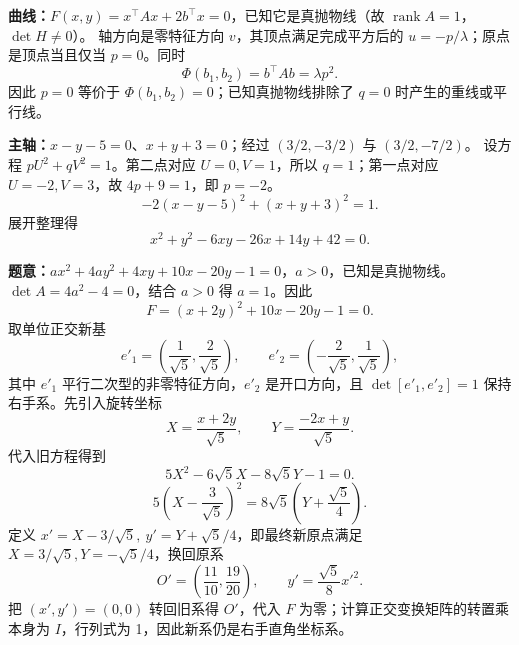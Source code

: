 \textbf{曲线：}$F(x,y)=x^\top Ax+2b^\top x=0$，已知它是真抛物线（故 $\operatorname{rank}A=1$，$\det H\ne0$）。
轴方向是零特征方向 $v$，其顶点满足完成平方后的 $u=-p/\lambda$；原点是顶点当且仅当 $p=0$。同时
\[
\Phi(b_1,b_2)=b^\top A b=\lambda p^2.
\]
因此 $p=0$ 等价于 $\Phi(b_1,b_2)=0$；已知真抛物线排除了 $q=0$ 时产生的重线或平行线。

\textbf{主轴：}$x-y-5=0$、$x+y+3=0$；经过 $(3/2,-3/2)$ 与 $(3/2,-7/2)$。
设方程 $pU^2+qV^2=1$。第二点对应 $U=0,V=1$，所以 $q=1$；第一点对应 $U=-2,V=3$，故 $4p+9=1$，即 $p=-2$。
\[
-2(x-y-5)^2+(x+y+3)^2=1.
\]
展开整理得
\[\boxed{x^2+y^2-6xy-26x+14y+42=0.}\]

\textbf{题意：}$ax^2+4ay^2+4xy+10x-20y-1=0$，$a>0$，已知是真抛物线。
 $\det A=4a^2-4=0$，结合 $a>0$ 得 $\boxed{a=1}$。因此
\[F=(x+2y)^2+10x-20y-1=0.
\]
 取单位正交新基
\[
e'_1=\left(\frac1{\sqrt5},\frac2{\sqrt5}\right),\qquad
e'_2=\left(-\frac2{\sqrt5},\frac1{\sqrt5}\right),
\]
其中 $e'_1$ 平行二次型的非零特征方向，$e'_2$ 是开口方向，且 $\det[e'_1,e'_2]=1$ 保持右手系。先引入旋转坐标
\[
X=\frac{x+2y}{\sqrt5},\qquad Y=\frac{-2x+y}{\sqrt5}.
\]
代入旧方程得到
\[
5X^2-6\sqrt5X-8\sqrt5Y-1=0.
\]
\[
5\left(X-\frac3{\sqrt5}\right)^2=8\sqrt5\left(Y+\frac{\sqrt5}{4}\right).
\]
定义 $x'=X-3/\sqrt5,\ y'=Y+\sqrt5/4$，即最终新原点满足 $X=3/\sqrt5,Y=-\sqrt5/4$，换回原系
\[
\boxed{O'=\left(\frac{11}{10},\frac{19}{20}\right)},\qquad
\boxed{y'=\frac{\sqrt5}{8}x'^2}.
\]
 把 $(x',y')=(0,0)$ 转回旧系得 $O'$，代入 $F$ 为零；计算正交变换矩阵的转置乘本身为 $I$，行列式为 1，因此新系仍是右手直角坐标系。
